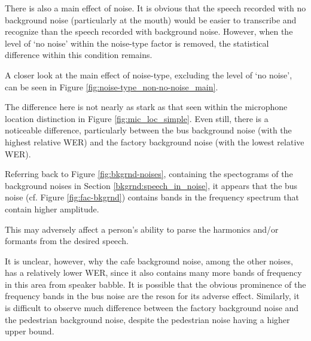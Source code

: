 \documentclass[dissertation,copyright]{uathesis}
\begin{document}
There is also a main effect of noise.  It is obvious that the speech recorded with no background noise (particularly at the mouth) would be easier to transcribe and recognize than the speech recorded with background noise.  However, when the level of `no noise' within the noise-type factor is removed, the statistical difference within this condition remains.

A closer look at the main effect of noise-type, excluding the level of `no noise', can be seen in Figure \ref{fig:noise-type_non-no-noise_main}.

The difference here is not nearly as stark as that seen within the microphone location distinction in Figure \ref{fig:mic_loc_simple}.  Even still, there is a noticeable difference, particularly between the bus background noise (with the highest relative WER) and the factory background noise (with the lowest relative WER).

Referring back to Figure \ref{fig:bkgrnd-noises}, containing the spectograms of the background noises in Section \ref{bkgrnd:speech_in_noise}, it appears that the bus noise (cf. Figure \ref{fig:fac-bkgrnd}) contains bands in the frequency spectrum that contain higher amplitude.

This may adversely affect a person's ability to parse the harmonics and/or formants from the desired speech. 

It is unclear, however, why the cafe background noise, among the other noises, has a relatively lower WER, since it also contains many more bands of frequency in this area from speaker babble. 
It is possible that the obvious prominence of the frequency bands in the bus noise are the reson for its adverse effect.  Similarly, it is difficult to observe much difference between the factory background noise and the pedestrian background noise, despite the pedestrian noise having a higher upper bound.
\end{document}
